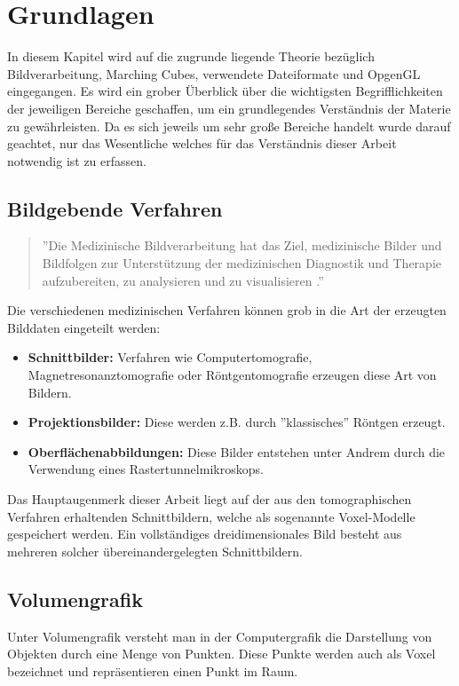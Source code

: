 \chapter{Grundlagen}
In diesem Kapitel wird auf die zugrunde liegende Theorie bezüglich Bildverarbeitung, Marching Cubes, verwendete Dateiformate und OpgenGL eingegangen. Es wird ein grober Überblick über die wichtigsten Begrifflichkeiten der jeweiligen Bereiche geschaffen, um ein grundlegendes Verständnis der Materie zu gewährleisten. Da es sich jeweils um sehr große Bereiche handelt wurde darauf geachtet, nur das Wesentliche welches für das Verständnis dieser Arbeit notwendig ist zu erfassen.
\section{Bildgebende Verfahren}
\begin{quote}
	''Die Medizinische Bildverarbeitung hat das Ziel, medizinische Bilder und Bildfolgen zur Unterstützung der medizinischen Diagnostik und Therapie aufzubereiten, zu analysieren und zu visualisieren \citep{MedBildVerarbeitung}.'' \\
\end{quote}
Die verschiedenen medizinischen Verfahren können grob in die Art der erzeugten Bilddaten eingeteilt werden:\\
\begin{itemize}
	\item \textbf{Schnittbilder:} Verfahren wie Computertomografie, Magnetresonanztomografie oder Röntgentomografie erzeugen diese Art von Bildern.
	\item \textbf{Projektionsbilder:} Diese werden z.B. durch ''klassisches'' Röntgen erzeugt.
	\item \textbf{Oberflächenabbildungen:} Diese Bilder entstehen unter Andrem durch die Verwendung eines Rastertunnelmikroskops.\\
\end{itemize}
Das Hauptaugenmerk dieser Arbeit liegt auf der aus den tomographischen Verfahren erhaltenden Schnittbildern, welche als sogenannte Voxel-Modelle gespeichert werden. Ein vollständiges dreidimensionales Bild besteht aus mehreren solcher übereinandergelegten Schnittbildern.

\section{Volumengrafik}
Unter Volumengrafik versteht man in der Computergrafik die Darstellung von Objekten durch eine Menge von Punkten. Diese Punkte werden auch als Voxel bezeichnet und repräsentieren einen Punkt im Raum.
